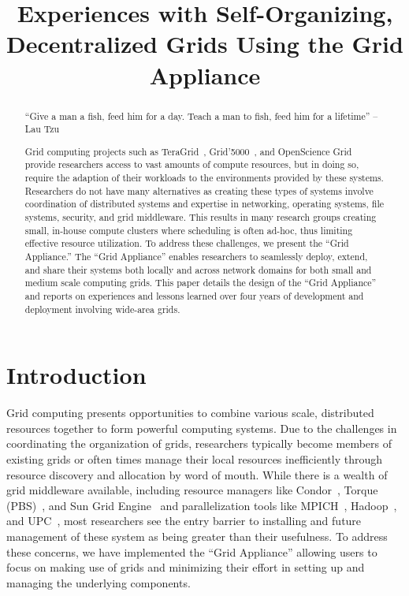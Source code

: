 \documentclass[conference]{IEEEtran}
\begin{document}
\title{Experiences with Self-Organizing, Decentralized Grids Using the Grid
Appliance}

\author{
}

\maketitle


\begin{abstract}

``Give a man a fish, feed him for a day.  Teach a man to fish, feed him for a
lifetime'' -- Lau Tzu

Grid computing projects such as TeraGrid~\cite{teragrid},
Grid'5000~\cite{grid_5000}, and OpenScience Grid~\cite{osg} provide researchers
access to vast amounts of compute resources, but in doing so, require the
adaption of their workloads to the environments provided by these systems.
Researchers do not have many alternatives as creating these types of systems
involve coordination of distributed systems and expertise in networking,
operating systems, file systems, security, and grid middleware.  This results
in many research groups creating small, in-house compute clusters where
scheduling is often ad-hoc, thus limiting effective resource utilization.  To
address these challenges, we present the ``Grid Appliance.''  The ``Grid
Appliance'' enables researchers to seamlessly deploy, extend, and share their
systems both locally and across network domains for both small and medium scale
computing grids.  This paper details the design of the ``Grid Appliance'' and
reports on experiences and lessons learned over four years of development and
deployment involving wide-area grids.

\end{abstract}

\section{Introduction}

Grid computing presents opportunities to combine various scale, distributed
resources together to form powerful computing systems.  Due to the challenges
in coordinating the organization of grids, researchers typically become members
of existing grids or often times manage their local resources inefficiently
through resource discovery and allocation by word of mouth.  While there is a
wealth of grid middleware available, including resource managers like
Condor~\cite{condor0}, Torque (PBS)~\cite{torque}, and Sun Grid
Engine~\cite{grid_engine} and parallelization tools like MPICH~\cite{mpich},
Hadoop~\cite{hadoop}, and UPC~\cite{upc}, most researchers see the entry
barrier to installing and future management of these system as being greater
than their usefulness.  To address these concerns, we have implemented the
``Grid Appliance'' allowing users to focus on making use of grids and minimizing
their effort in setting up and managing the underlying components.
\end{document}
